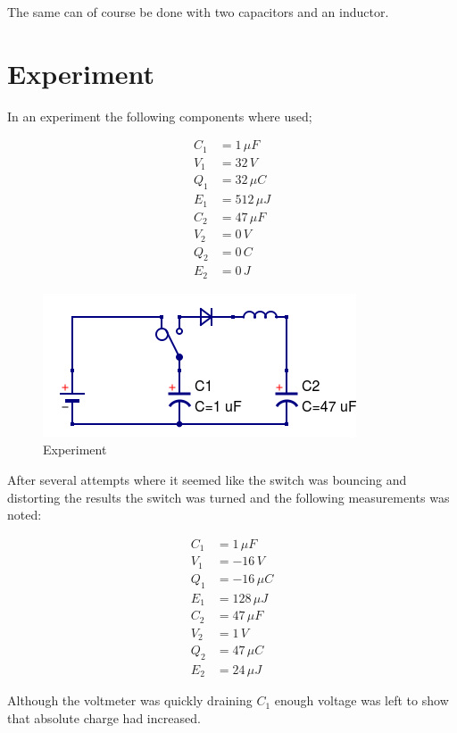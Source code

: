 \documentclass[]{../common/elementary-physics}
\begin{document}
The same can of course be done with two capacitors and an inductor.

\pagebreak

\section{Experiment}

In an experiment the following components where used;

\begin{align}
C_1 &= 1 \, \mu F \\
V_1 &= 32 \, V \\
Q_1 &= 32 \, \mu C \\
E_1 &= 512 \, \mu J \\
C_2 &= 47 \, \mu F \\
V_2 &= 0 \, V \\
Q_2 &= 0 \, C \\
E_2 &= 0 \, J
\end{align}

\begin{figure}[ht] \centering
	\includegraphics[scale=.5]{BLCC} \caption{Experiment}
\end{figure}

After several attempts where it seemed like the switch was bouncing and distorting the results the switch was turned and the following measurements was noted:

\begin{align}
C_1 &= 1 \, \mu F \\
V_1 &= -16 \, V \\
Q_1 &= -16 \, \mu C \\
E_1 &= 128 \, \mu J \\
C_2 &= 47 \, \mu F \\
V_2 &= 1 \, V \\
Q_2 &= 47 \, \mu C \\
E_2 &= 24 \, \mu J
\end{align}

Although the voltmeter was quickly draining $C_1$ enough voltage was left to show that absolute charge had increased.
\end{document}
